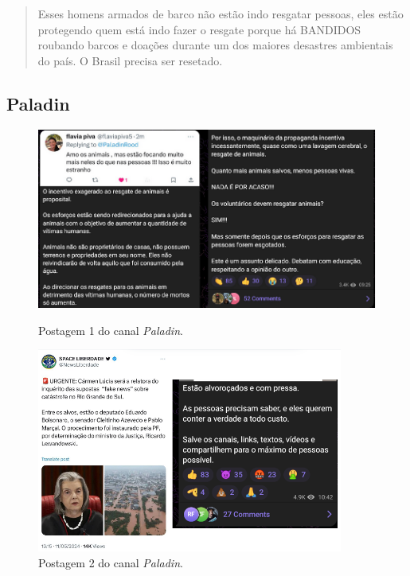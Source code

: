 \documentclass[portuguese]{textolivre}
\begin{document}
\begin{quote}
    Esses homens armados de barco não estão indo resgatar pessoas, eles estão protegendo quem está indo fazer o resgate porque há BANDIDOS roubando barcos e doações durante um dos maiores desastres ambientais do país. O Brasil precisa ser resetado.
\end{quote}

\subsection{Paladin}

\begin{figure}[h!]
    \centering
    \begin{minipage}[t]{0.50\textwidth}
        \centering
        \includegraphics[width=\linewidth]{Imagens/Fig23.png}
        \caption{Postagem 1 do canal \emph{Paladin}.}
        \label{fig-23}
    \end{minipage}
    \hfill
    \begin{minipage}[t]{0.46\textwidth}
        \centering
        \includegraphics[width=\linewidth]{Imagens/Fig24.png}
        \caption{Postagem 2 do canal \emph{Paladin}.}
        \label{fig-24}
    \end{minipage}
    

\end{figure}
\end{document}
